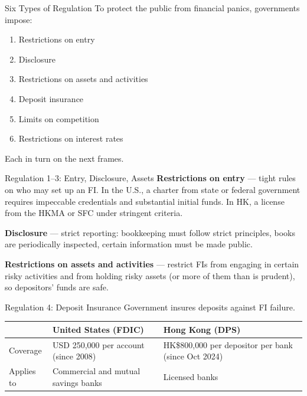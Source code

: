\documentclass[aspectratio=169]{beamer}
\begin{document}
\begin{frame}{Six Types of Regulation}
To protect the public from financial panics, governments impose:
\begin{enumerate}
  \item Restrictions on entry
  \item Disclosure
  \item Restrictions on assets and activities
  \item Deposit insurance
  \item Limits on competition
  \item Restrictions on interest rates
\end{enumerate}
\vspace{0.3em}
Each in turn on the next frames.
\end{frame}

\begin{frame}{Regulation 1--3: Entry, Disclosure, Assets}
\textbf{Restrictions on entry} --- tight rules on who may set up an FI. In the U.S., a charter from state or federal government requires impeccable credentials and substantial initial funds. In HK, a license from the HKMA or SFC under stringent criteria.
\vspace{0.3em}

\textbf{Disclosure} --- strict reporting: bookkeeping must follow strict principles, books are periodically inspected, certain information must be made public.
\vspace{0.3em}

\textbf{Restrictions on assets and activities} --- restrict FIs from engaging in certain risky activities and from holding risky assets (or more of them than is prudent), so depositors' funds are safe.
\end{frame}

\begin{frame}{Regulation 4: Deposit Insurance}
Government insures deposits against FI failure.
\begin{center}
\begin{tabular}{lll}
\toprule
 & United States (FDIC) & Hong Kong (DPS) \\
\midrule
Coverage & USD 250{,}000 per account (since 2008) & HK\$800{,}000 per depositor per bank (since Oct 2024) \\
Applies to & Commercial and mutual savings banks & Licensed banks \\
\bottomrule
\end{tabular}
\end{center}
\end{frame}
\end{document}
